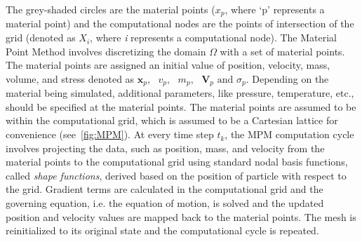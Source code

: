 The grey-shaded circles are the material points ($x_{p}$, where `p' represents 
a material point) and the computational nodes are the points of intersection of 
the grid (denoted as $X_{i}$, where \textit{i} represents a computational 
node). The Material Point Method involves discretizing the domain $\Omega$ with 
a set of material points. The material points are assigned an initial value of 
position, velocity, mass, volume, and stress denoted as $\mathbf{x}_{p},\mbox{  
} \mathbf{\mathit{v}}_{p},\mbox{  } \mathit{m}_{p}, \mbox{  
}\mathbf{V}_{p}\mbox{ and }\sigma_{p} $. Depending on the material being 
simulated, additional parameters, like pressure, temperature, etc., should be 
specified at the material points. The material points are assumed to be within 
the computational grid, which is assumed to be a Cartesian lattice for 
convenience (see~\cref{fig:MPM}). At every time step $\mathit{t}_{k}$, 
the MPM computation cycle involves projecting the data, such as position, mass, 
and velocity from the material points to the computational grid using standard 
nodal basis functions, called \textit{shape functions}, derived based on the 
position of particle with respect to the grid. Gradient terms are calculated in 
the computational grid and the governing equation, i.e. the equation of motion, 
is solved and the updated position and velocity values are mapped back to the 
material points. The mesh is reinitialized to its original state and the 
computational cycle is repeated. 

